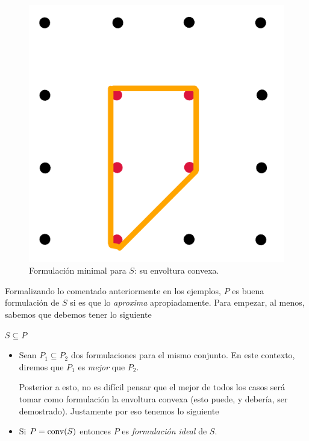 \begin{figure}[H] 
    \centering
    \includegraphics[scale=0.3]{formulacion3.png}
    \caption{Formulación minimal para $S$: su envoltura convexa.}
    \label{fig:formulacion3}
\end{figure}


Formalizando lo comentado anteriormente en los ejemplos, $P$ es buena formulación de $S$ si es que lo \emph{aproxima} apropiadamente. Para empezar, al menos, sabemos que debemos tener lo siguiente 
\begin{center}
$S\subseteq P$
\end{center}
\begin{itemize}

    \item Sean $P_1\subseteq P_2$ dos formulaciones para el mismo conjunto. En este contexto, diremos que $P_1$ es \emph{mejor} que $P_2$.
    
    Posterior a esto, no es difícil pensar que el mejor de todos los casos será tomar como formulación la envoltura convexa (esto puede, y debería, ser demostrado). Justamente por eso tenemos lo siguiente
    
    \item Si $P=\operatorname{conv}(S)$ entonces $P$ es \emph{formulación ideal} de $S$.
\end{itemize}

